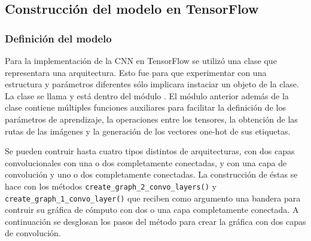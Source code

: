 
\subsection{Construcción del modelo en TensorFlow}
\label{\detokenize{model_desc:creacion-y-ejecucion-de-la-grafica-de-tensorflow}}

\subsubsection{Definición del modelo}

Para la implementación de la CNN en TensorFlow
se utilizó una clase que representara una
arquitectura. Esto fue para que experimentar con
una estructura y parámetros diferentes sólo
implicara instaciar un objeto de la clase.
La clase se llama  y
está dentro del módulo {\hyperref[\detokenize{model_desc:module-cnn\_indoor\_classifier\_model}]{}}.
El módulo anterior además de la clase contiene múltiples
funciones auxiliares para facilitar la definición
de los parámetros de aprendizaje, la operaciones entre los
tensores, la obtención de las rutas de las imágenes
y la generación de los vectores one-hot de sus etiquetas.

Se pueden contruir hasta cuatro tipos distintos de
arquitecturas, con dos capas convolucionales con una o dos
completamente conectadas, y con una capa de convolución
y uno o dos completamente conectadas.
La construcción de éstas se hace con los métodos
\texttt{create\_graph\_2\_convo\_layers()}
y \texttt{create\_graph\_1\_convo\_layer()}
que reciben como argumento una bandera para contruir su gráfica
de cómputo con dos o una capa completamente conectada. A
continuación se desglosan los pasos del método para
crear la gráfica con dos capas de convolución.

